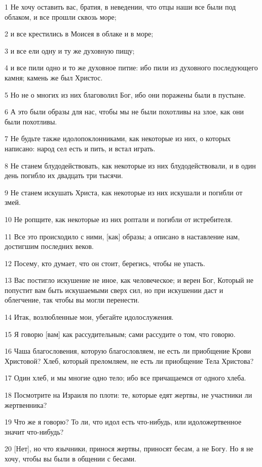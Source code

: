 \par 1 Не хочу оставить вас, братия, в неведении, что отцы наши все были под облаком, и все прошли сквозь море;
\par 2 и все крестились в Моисея в облаке и в море;
\par 3 и все ели одну и ту же духовную пищу;
\par 4 и все пили одно и то же духовное питие: ибо пили из духовного последующего камня; камень же был Христос.
\par 5 Но не о многих из них благоволил Бог, ибо они поражены были в пустыне.
\par 6 А это были образы для нас, чтобы мы не были похотливы на злое, как они были похотливы.
\par 7 Не будьте также идолопоклонниками, как некоторые из них, о которых написано: народ сел есть и пить, и встал играть.
\par 8 Не станем блудодействовать, как некоторые из них блудодействовали, и в один день погибло их двадцать три тысячи.
\par 9 Не станем искушать Христа, как некоторые из них искушали и погибли от змей.
\par 10 Не ропщите, как некоторые из них роптали и погибли от истребителя.
\par 11 Все это происходило с ними, [как] образы; а описано в наставление нам, достигшим последних веков.
\par 12 Посему, кто думает, что он стоит, берегись, чтобы не упасть.
\par 13 Вас постигло искушение не иное, как человеческое; и верен Бог, Который не попустит вам быть искушаемыми сверх сил, но при искушении даст и облегчение, так чтобы вы могли перенести.
\par 14 Итак, возлюбленные мои, убегайте идолослужения.
\par 15 Я говорю [вам] как рассудительным; сами рассудите о том, что говорю.
\par 16 Чаша благословения, которую благословляем, не есть ли приобщение Крови Христовой? Хлеб, который преломляем, не есть ли приобщение Тела Христова?
\par 17 Один хлеб, и мы многие одно тело; ибо все причащаемся от одного хлеба.
\par 18 Посмотрите на Израиля по плоти: те, которые едят жертвы, не участники ли жертвенника?
\par 19 Что же я говорю? То ли, что идол есть что-нибудь, или идоложертвенное значит что-нибудь?
\par 20 [Нет], но что язычники, принося жертвы, приносят бесам, а не Богу. Но я не хочу, чтобы вы были в общении с бесами.
